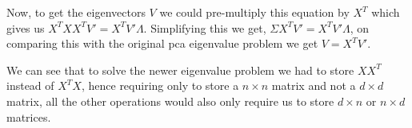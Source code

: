 \documentclass[twoside]{article}
\begin{document}
Now, to get the eigenvectors $V$ we could pre-multiply this equation by $X^T$ which gives us $X^TXX^T V' = X^T V' \Lambda$. Simplifying this we get, $\Sigma X^T V' = X^T V' \Lambda$, on comparing this with the original pca eigenvalue problem we get $V = X^T V'$.

We can see that to solve the newer eigenvalue problem we had to store $XX^T$ instead of $X^TX$, hence requiring only to store a $n \times n$ matrix and not a $d \times d$ matrix, all the other operations would also only require us to store $d \times n$ or $n \times d$ matrices.
\end{document}
